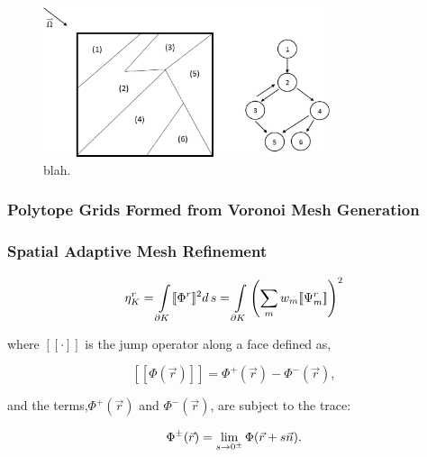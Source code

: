 \begin{figure}
\centering
\includegraphics[width=0.75\textwidth]{figures/sec_Sn/graph_with_cycling.eps}
\caption[blah]{blah.}
\label{fig::Sn_Solution_Spatial_Sweeping_sweepWcycle}
\end{figure}

\subsubsection{Polytope Grids Formed from Voronoi Mesh Generation}
\label{sec::Sn_Solution_Spatial_Voronoi}



\subsubsection{Spatial Adaptive Mesh Refinement}
\label{sec::Sn_Solution_Spatial_AMR}



\begin{equation}
\label{eq::Sn_AMR_jump_err_est}
\eta_K^r = \int\displaylimits_{\partial K} [\![ \Phi^r ]\!]^2 d \, s = \int\displaylimits_{\partial K} \left(  \sum_m w_m [\![ \Psi_m^r ]\!]  \right)^2
\end{equation}

\noindent where $[\![ \cdot ]\!]$ is the jump operator along a face defined as,

\begin{equation}
\label{eq::Sn_AMR_jump_def}
[\![ \Phi (\vec{r}) ]\!] = \Phi^+ (\vec{r}) - \Phi^- (\vec{r}),
\end{equation}

\noindent and the terms,$\Phi^+ (\vec{r})$ and $\Phi^- (\vec{r})$, are subject to the trace:

\begin{equation}
\label{eq::Sn_AMR_jump_trace}
\Phi^{\pm} (\vec{r})  = \lim\displaylimits_{s \rightarrow 0^{\pm}} \Phi (\vec{r} + s \vec{n}).
\end{equation}

